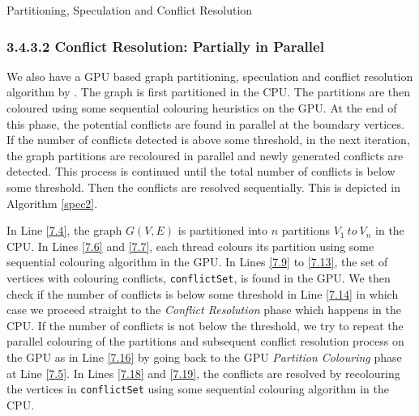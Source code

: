 \documentclass[MTech]{iitmdiss}
\makeatletter
\def\BState{\State\hskip-\ALG@thistlm}
\makeatother
\begin{document}
\begin{algorithm}
\caption{Partitioning, Speculation and Conflict Resolution}\label{spec1}
\end{algorithm}

\subsubsection{3.4.3.2 \: \: Conflict Resolution: Partially in Parallel}
We also have a GPU based graph partitioning, speculation and conflict resolution algorithm by \citet{Grosset:2011:EGC:2038037.1941597}. The graph is first partitioned in the CPU. The partitions are then coloured using some sequential colouring heuristics on the GPU. At the end of this phase, the potential conflicts are found in parallel at the boundary vertices. If the number of conflicts detected is above some threshold, in the next iteration, the graph partitions are recoloured in parallel and newly generated conflicts are detected. This process is continued until the total number of conflicts is below some threshold. Then the conflicts are resolved sequentially. This is depicted in Algorithm \ref{spec2}.

In Line \ref{7.4}, the graph $G(V,E)$ is partitioned into $n$ partitions $V_{1} \: to \: V_{n}$ in the CPU. In Lines \ref{7.6} and \ref{7.7}, each thread colours its partition using some sequential colouring algorithm in the GPU. In Lines \ref{7.9} to \ref{7.13}, the set of vertices with colouring conflicts, \verb+conflictSet+, is found in the GPU. We then check if the number of conflicts is below some threshold in Line \ref{7.14} in which case we proceed straight to the \textit{Conflict Resolution} phase which happens in the CPU. If the number of conflicts is not below the threshold, we try to repeat the parallel colouring of the partitions and subsequent conflict resolution process on the GPU as in Line \ref{7.16} by going back to the GPU \textit{Partition Colouring} phase at Line \ref{7.5}. In Lines \ref{7.18} and \ref{7.19}, the conflicts are resolved by recolouring the vertices in \verb+conflictSet+ using some sequential colouring algorithm in the CPU.
\end{document}
